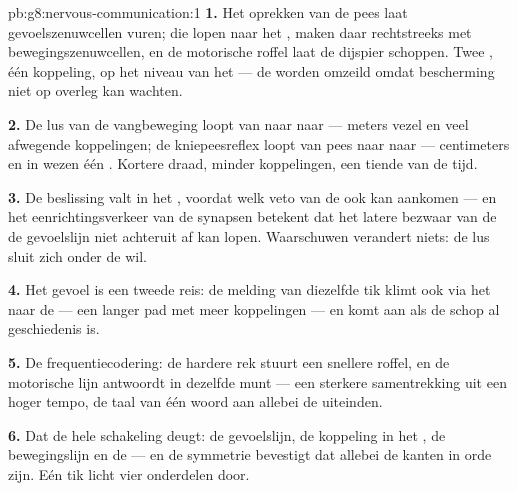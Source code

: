\begin{solution}{pb:g8:nervous-communication:1}
\textbf{1.} Het oprekken van de pees laat gevoelszenuwcellen vuren; die
lopen naar het \emph{}, maken daar rechtstreeks  met
bewegingszenuwcellen, en de motorische roffel laat de dijspier schoppen.
Twee  , één koppeling, op het niveau van het 
--- de  worden omzeild omdat bescherming niet op overleg kan
wachten.

\textbf{2.} De lus van de vangbeweging loopt van  naar  naar
 --- meters vezel en veel afwegende koppelingen; de kniepeesreflex
loopt van pees naar  naar  --- centimeters en in wezen één
. Kortere draad, minder koppelingen, een tiende van de tijd.

\textbf{3.} De beslissing valt in het , voordat welk veto van de
 ook kan aankomen --- en het eenrichtingsverkeer van de synapsen
betekent dat het latere bezwaar van de  de gevoelslijn niet
achteruit af kan lopen. Waarschuwen verandert niets: de lus sluit zich
onder de wil.

\textbf{4.} Het gevoel is een tweede reis: de melding van diezelfde tik
klimt ook via het  naar de  --- een langer pad met meer
koppelingen --- en komt aan als de schop al geschiedenis is.

\textbf{5.} De frequentiecodering: de hardere rek stuurt een snellere
roffel, en de motorische lijn antwoordt in dezelfde munt --- een sterkere
samentrekking uit een hoger tempo, de taal van één woord aan allebei de
uiteinden.

\textbf{6.} Dat de hele schakeling deugt: de gevoelslijn, de koppeling in
het , de bewegingslijn en de  --- en de symmetrie bevestigt
dat allebei de kanten in orde zijn. Eén tik licht vier onderdelen door.


\end{solution}
